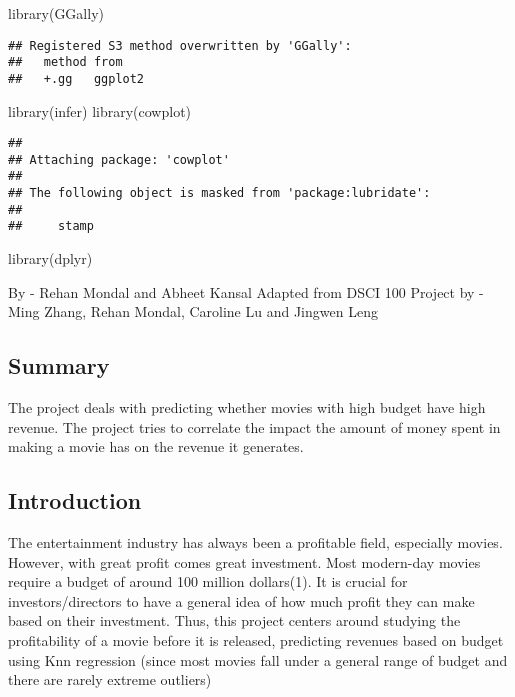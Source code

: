 \documentclass[
]{article}
\newenvironment{Shaded}{\begin{snugshade}}{\end{snugshade}}
\newcommand{\FunctionTok}[1]{\textcolor[rgb]{0.00,0.00,0.00}{#1}}
\newcommand{\NormalTok}[1]{#1}
\begin{document}
\begin{Shaded}
\begin{Highlighting}[]
\FunctionTok{library}\NormalTok{(GGally)}
\end{Highlighting}
\end{Shaded}

\begin{verbatim}
## Registered S3 method overwritten by 'GGally':
##   method from   
##   +.gg   ggplot2
\end{verbatim}

\begin{Shaded}
\begin{Highlighting}[]
\FunctionTok{library}\NormalTok{(infer)}
\FunctionTok{library}\NormalTok{(cowplot)}
\end{Highlighting}
\end{Shaded}

\begin{verbatim}
## 
## Attaching package: 'cowplot'
## 
## The following object is masked from 'package:lubridate':
## 
##     stamp
\end{verbatim}

\begin{Shaded}
\begin{Highlighting}[]
\FunctionTok{library}\NormalTok{(dplyr)}
\end{Highlighting}
\end{Shaded}

By - Rehan Mondal and Abheet Kansal Adapted from DSCI 100 Project by - Ming Zhang, Rehan Mondal, Caroline Lu and Jingwen Leng

\hypertarget{summary}{%
\subsection{Summary}\label{summary}}

The project deals with predicting whether movies with high budget have high revenue. The project tries to correlate the impact the amount of money spent in making a movie has on the revenue it generates.

\hypertarget{introduction}{%
\subsection{Introduction}\label{introduction}}

The entertainment industry has always been a profitable field, especially movies. However, with great profit comes great investment. Most modern-day movies require a budget of around 100 million dollars(1). It is crucial for investors/directors to have a general idea of how much profit they can make based on their investment. Thus, this project centers around studying the profitability of a movie before it is released, predicting revenues based on budget using Knn regression (since most movies fall under a general range of budget and there are rarely extreme outliers)
\end{document}
